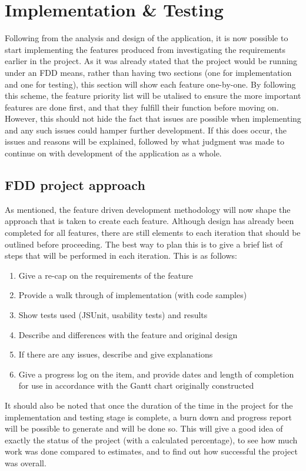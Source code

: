 \chapter{Implementation \& Testing}
Following from the analysis and design of the application, it is now possible to start implementing the features produced from investigating the requirements earlier in the project. As it was already stated that the project would be running under an FDD means, rather than having two sections (one for implementation and one for testing), this section will show each feature one-by-one. By following this scheme, the feature priority list will be utalised to ensure the more important features are done first, and that they fulfill their function before moving on. However, this should not hide the fact that issues are possible when implementing and any such issues could hamper further development. If this does occur, the issues and reasons will be explained, followed by what judgment was made to continue on with development of the application as a whole.

\section{FDD project approach}
As mentioned, the feature driven development methodology will now shape the approach that is taken to create each feature. Although design has already been completed for all features, there are still elements to each iteration that should be outlined before proceeding. The best way to plan this is to give a brief list of steps that will be performed in each iteration. This is as follows:

\begin{enumerate}
\item Give a re-cap on the requirements of the feature
\item Provide a walk through of implementation (with code samples)
\item Show tests used (JSUnit, usability tests) and results
\item Describe and differences with the feature and original design
\item If there are any issues, describe and give explanations
\item Give a progress log on the item, and provide dates and length of completion for use in accordance with the Gantt chart originally constructed
\end{enumerate}

It should also be noted that once the duration of the time in the project for the implementation and testing stage is complete, a burn down and progress report will be possible to generate and will be done so. This will give a good idea of exactly the status of the project (with a calculated percentage), to see how much work was done compared to estimates, and to find out how successful the project was overall. 

